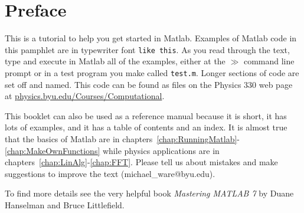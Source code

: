 \chapter*{Preface}

This is a tutorial to help you get started in Matlab. Examples of
Matlab code in this pamphlet are in typewriter font {\tt like
this}. As you read through the text, type and execute in Matlab all
of the examples, either at the $\gg$ command line prompt or in a
test program you make called {\tt test.m}. Longer sections of code
are set off and named.  This code can be found as files on the
Physics 330 web page at
\href{http://www.physics.byu.edu/Courses/Computational/phys330.aspx}{physics.byu.edu/Courses/Computational}.

This booklet can also be used as a reference manual because it is
short, it has lots of examples, and it has a table of contents and
an index. It is almost true that the basics of Matlab are in
chapters~\ref{chap:RunningMatlab}-\ref{chap:MakeOwnFunctions} while
physics applications are in
chapters~\ref{chap:LinAlg}-\ref{chap:FFT}. Please tell us about
mistakes and make suggestions to improve the text
(michael\_ware@byu.edu).

To find more details see the very helpful book {\it Mastering
MATLAB 7} by Duane Hanselman and Bruce Littlefield.
